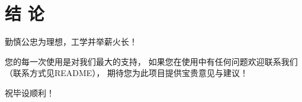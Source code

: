 \chapter*{结 \qquad 论}     %

勤慎公忠为理想，工学并举薪火长！

您的每一次使用是对我们最大的支持，
如果您在使用中有任何问题欢迎联系我们（联系方式见README），
期待您为此项目提供宝贵意见与建议！

祝毕设顺利！